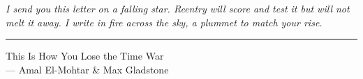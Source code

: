 \thispagestyle{empty}
\newpage\markboth{}{}

\vspace*{0.3\textheight}
\begin{center}
\noindent\begin{minipage}{0.8\textwidth}
\emph{I send you this letter on a falling star. Reentry will score and test it but will not melt it away. I write in fire across the sky, a plummet to match your rise.}
\rule{\textwidth}{1pt}
\begin{flushright}
  {This Is How You Lose the Time War\hspace*{0.1\textwidth}}
  \\
  {--- Amal El-Mohtar \& Max Gladstone}
\end{flushright}
\end{minipage}
\end{center}